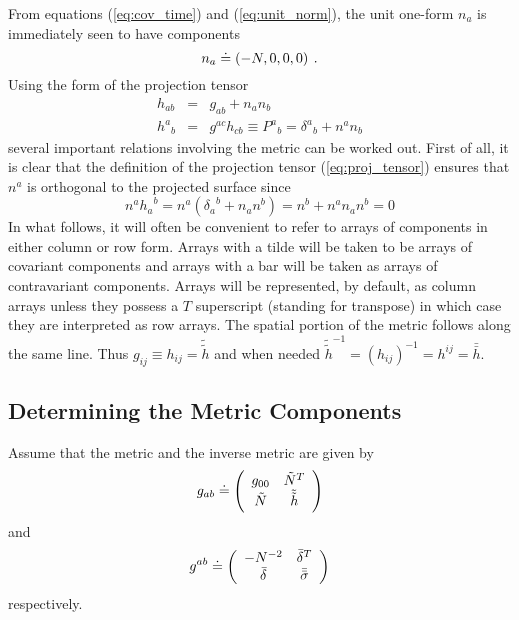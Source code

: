 From equations (\ref{eq:cov_time}) and (\ref{eq:unit_norm}), the unit
one-form $n_a$ is immediately seen to have components
\[
   n_a \doteq \left(-N, 0, 0, 0 \right) \: .
\]
Using the form of the projection tensor
\begin{eqnarray}\label{eq:proj_tensor}
   h_{ab} & = & g_{ab} + n_{a}n_{b} \nonumber \\
   {h^{a}}_{b} & = &  g^{ac} h_{cb} \equiv {P^{a}}_{b} =
   {\delta^{a}}_{b} + n^{a} n_{b}
\end{eqnarray}
several important relations involving the metric can be worked out.  First of
all, it is clear that the definition of the projection tensor
(\ref{eq:proj_tensor}) ensures that $n^a$ is orthogonal to the projected
surface since
\[
   n^a {h_a}^b = n^a \left( {\delta_a}^b + n_a n^b \right) = n^b + n^a n_a n^b = 0
\]
In what follows, it will often be convenient to refer to arrays of components
in either column or row form.  Arrays with a tilde will be taken to be arrays
of covariant components and arrays with a bar will be taken as arrays of contravariant
components.  Arrays will be represented, by default, as column arrays unless
they possess a $T$ superscript (standing for transpose) in which case they are
interpreted as row arrays.
The spatial portion of the metric follows along the same line.  Thus
$g_{ij} \equiv h_{ij} = {\tilde{\tilde h}}$ and when needed
${\tilde {\tilde h}}^{-1} = \left( h_{ij} \right)^{-1} = h^{ij} =
{\bar {\bar h}}$.


\subsection{Determining the Metric Components}\label{SS:g_comps}

Assume that the metric and the inverse metric are given by
\[
   g_{ab} \doteq
   \left(
     \begin{array}{c c}
       g_{00}     & {\tilde N}^{T} \\
       {\tilde N} & {\tilde {\tilde h}}
     \end{array}
   \right)
\]
and
\[
   g^{ab} \doteq
   \left(
     \begin{array}{c c}
       -N^{-2}        & {\bar \delta}^{T} \\
       {\bar \delta}  & {\bar {\bar \sigma}}
     \end{array}
   \right)
\]
respectively.

